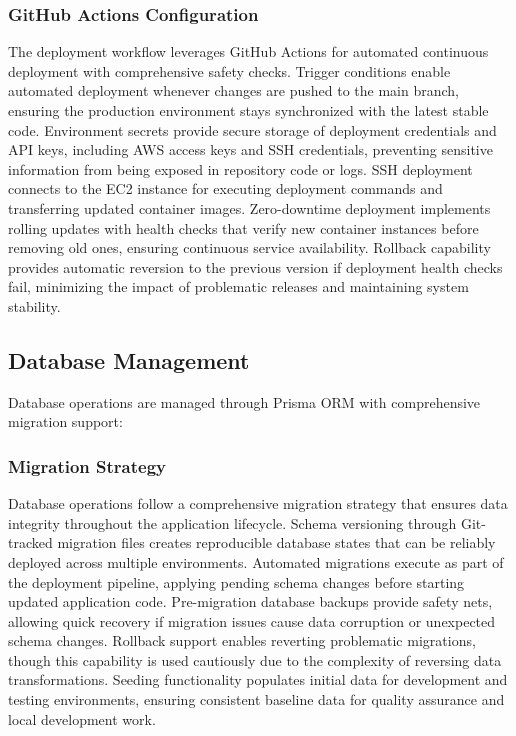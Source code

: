 \subsubsection{GitHub Actions Configuration}
The deployment workflow leverages GitHub Actions for automated continuous deployment with comprehensive safety checks. Trigger conditions enable automated deployment whenever changes are pushed to the main branch, ensuring the production environment stays synchronized with the latest stable code. Environment secrets provide secure storage of deployment credentials and API keys, including AWS access keys and SSH credentials, preventing sensitive information from being exposed in repository code or logs. SSH deployment connects to the EC2 instance for executing deployment commands and transferring updated container images. Zero-downtime deployment implements rolling updates with health checks that verify new container instances before removing old ones, ensuring continuous service availability. Rollback capability provides automatic reversion to the previous version if deployment health checks fail, minimizing the impact of problematic releases and maintaining system stability.

\subsection{Database Management}
Database operations are managed through Prisma ORM with comprehensive migration support:

\subsubsection{Migration Strategy}
Database operations follow a comprehensive migration strategy that ensures data integrity throughout the application lifecycle. Schema versioning through Git-tracked migration files creates reproducible database states that can be reliably deployed across multiple environments. Automated migrations execute as part of the deployment pipeline, applying pending schema changes before starting updated application code. Pre-migration database backups provide safety nets, allowing quick recovery if migration issues cause data corruption or unexpected schema changes. Rollback support enables reverting problematic migrations, though this capability is used cautiously due to the complexity of reversing data transformations. Seeding functionality populates initial data for development and testing environments, ensuring consistent baseline data for quality assurance and local development work.

